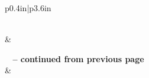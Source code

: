 \normalsize



 
\begin{center}
\begin{longtable}{p{0.4in}|p{3.6in}}
\caption[Word lengths for 1 Kings 18]{Word lengths for 1 Kings 18} \label{table:Word Lengths-1KI-18} \\ 
\hline {} &    \\ \hline 
\endfirsthead
 
{{\bfseries \tablename\ \thetable{} -- continued from previous page}} \\  
\hline {} &    \\ \hline 
\endhead
 

\end{longtable}
\end{center}
